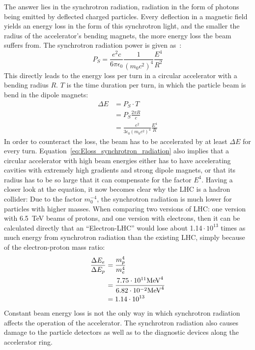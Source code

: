 The answer lies in the synchrotron radiation, radiation in the form of photons being emitted by deflected charged particles.
Every deflection in a magnetic field yields an energy loss in the form of this synchrotron light, and the smaller the radius of the accelerator's bending magnets, the more energy loss the beam suffers from.
The synchrotron radiation power is given as~\cite[p. 33]{Wille}:
\begin{equation}
 P_S = \frac{e^2c}{6\pi\epsilon_0}\frac{1}{(m_0c^2)^4}\frac{E^4}{R^2}
\end{equation}
This directly leads to the energy loss per turn in a circular accelerator with a bending radius $R$.
$T$ is the time duration per turn, in which the particle beam is bend in the dipole magnets:
\begin{align}
 \Delta E &= P_S\cdot T\\
 &= P_S\frac{2\pi R}{c}\\
 &=\frac{e^2}{3\epsilon_0(m_0c^2)^4}\frac{E^4}{R} \label{eq:Eloss_synchrotron_radiation}
\end{align}
In order to counteract the loss, the beam has to be accelerated by at least $\Delta E$ for every turn.
Equation~\ref{eq:Eloss_synchrotron_radiation} also implies that a circular accelerator with high beam energies either has to have accelerating cavities with extremely high gradients and strong dipole magnets, or that its radius has to be so large that it can compensate for the factor $E^4$.
Having a closer look at the equation, it now becomes clear why the LHC is a hadron collider:
Due to the factor $m_0^{-4}$, the synchrotron radiation is much lower for particles with higher masses.
When comparing two versions of LHC: one version with \SI{6.5}{\TeV} beams of protons, and one version with electrons, then it can be calculated directly that an ``Electron-LHC'' would lose about 1.14\,$\cdot\,10^{13}$ times as much energy from synchrotron radiation than the existing LHC, simply because of the electron-proton mass ratio: 
\begin{align*}
 \frac{\Delta E_e}{\Delta E_p} &=\frac{m_p^4}{m_e^4}\\
 &= \frac{7.75\cdot10^{11} \textnormal{MeV}^4}{6.82\cdot10^{-2} \textnormal{MeV}^4}\\
 &=1.14\cdot10^{13}
\end{align*}
Constant beam energy loss is not the only way in which synchrotron radiation affects the operation of the accelerator.
The synchrotron radiation also causes damage to the particle detectors as well as to the diagnostic devices along the accelerator ring.
